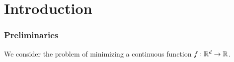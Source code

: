 
\chapter{Introduction}
\label{ch:Introduction}

\subsection{Preliminaries}

We consider the problem of minimizing a continuous function \( f : \mathbb{R}^d \rightarrow \mathbb{R} \). 

\endinput
